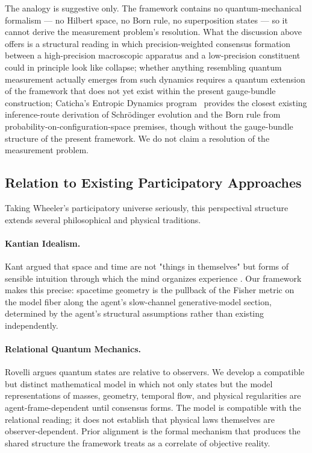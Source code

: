 \documentclass[11pt]{article}
\begin{document}
The analogy is suggestive only. The framework contains no quantum-mechanical formalism — no Hilbert space, no Born rule, no superposition states — so it cannot derive the measurement problem's resolution. What the discussion above offers is a structural reading in which precision-weighted consensus formation between a high-precision macroscopic apparatus and a low-precision constituent could in principle look like collapse; whether anything resembling quantum measurement actually emerges from such dynamics requires a quantum extension of the framework that does not yet exist within the present gauge-bundle construction; Caticha's Entropic Dynamics program~\cite{Caticha2015, Caticha2019, JohnsonCaticha2011} provides the closest existing inference-route derivation of Schr\"odinger evolution and the Born rule from probability-on-configuration-space premises, though without the gauge-bundle structure of the present framework. We do not claim a resolution of the measurement problem.

\subsection{Relation to Existing Participatory Approaches}

Taking Wheeler's participatory universe \cite{Wheeler1990} seriously,  this perspectival structure extends several philosophical and physical
traditions.

\paragraph{Kantian Idealism.} Kant argued that space and time are not "things in themselves" but forms of sensible intuition through which the mind organizes experience \cite{Kant1781}. Our framework makes this precise: spacetime geometry is the pullback of the Fisher metric on the model fiber along the agent's slow-channel generative-model section, determined by the agent's structural assumptions rather than existing independently.

\paragraph{Relational Quantum Mechanics.} Rovelli \cite{Rovelli1996}
argues quantum states are relative to observers. We develop a compatible but distinct mathematical model in which not only states but the model representations of masses, geometry, temporal flow, and physical regularities are agent-frame-dependent until consensus forms. The model is compatible with the relational reading; it does not establish that physical laws themselves are observer-dependent. Prior alignment is the formal mechanism that produces the shared structure the framework treats as a correlate of objective reality.
\end{document}
